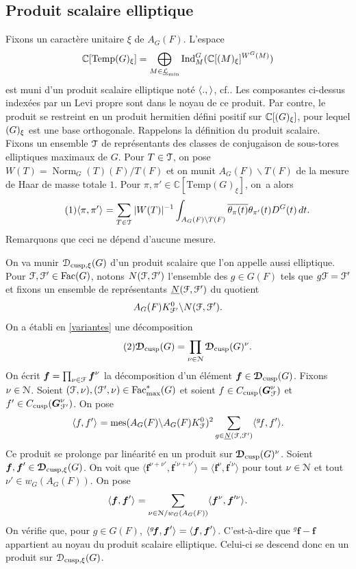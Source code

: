 \documentclass[11pt]{article}
\newcommand{\cf}{cf.\xspace}
\numberwithin{equation}{section}\providecommand{\og}{«\,}\providecommand{\fg}{\,»}
\let\mathcal \EuScript
\newcommand{\NoChangel}[1]{%
\expandafter\let\csname old\string#1\endcsname=#1
\let#1=\relax
\newcommand{#1}{\mathcode`l="716C\csname old\string#1\endcsname\mathcode`l="7160 }%
}
\let\<\langle
\let\>\rangle
\let\oldS\S
\renewcommand{\S}{\oldS\,}
\newcommand{\gf}{{}^g\!f}
\newcommand{\cusp}{\mathrm{cusp}}
\newcommand{\rell}{\mathrm{ell}} \NoChangel{\rell}
\newcommand{\Ell}{\mathrm{Ell}} \NoChangel{\Ell}
\newcommand{\Fac}{\mathrm{Fac}}
\newcommand{\Ind}{\mathrm{Ind}}
\newcommand{\Temp}{\mathrm{Temp}}
\DeclareMathOperator{\mes}{mes}
\DeclareMathOperator{\Norm}{Norm}
\newcommand{\bmf}{\boldsymbol{f}}
\newcommand{\gbmf}{{}^g\!\boldsymbol{f}}
\newcommand{\bG}{\boldsymbol{G}}
\newcommand{\cD}{\mathcal{D}}
\newcommand{\cF}{\mathcal{F}}
\newcommand{\cL}{\mathcal{L}}
\newcommand{\cN}{\mathcal{N}}
\newcommand{\cT}{\mathcal{T}}
\newcommand{\CC}{\mathbb{C}}
\theoremstyle{plain}
\theoremstyle{definition}
\begin{document}
\subsection{Produit scalaire elliptique}\label{produitscalaireelliptique}
Fixons un caractère unitaire $\xi$ de $A_{G}(F)$. L'espace
\[
\CC[\Temp(G)_{\xi}]=\bigoplus_{M\in\underline{\cL}_{\min}}\Ind_{M}^G(\CC[\Ell(M)_{\xi}]^{W^G(M)})
\]
est muni d'un produit scalaire elliptique noté $\<.,\>_{\rell}$, \cf \cite[\S6]{A2}. Les composantes ci-dessus indexées par un Levi propre sont dans le noyau de ce produit. Par contre, le produit se restreint en un produit hermitien défini positif sur $\CC[\Ell(G)_{\xi}]$, pour lequel $\Ell(G)_{\xi}$ est une base orthogonale. Rappelons la définition du produit scalaire. Fixons un ensemble $\cT_{\rell}$ de représentants des classes de conjugaison de sous-tores elliptiques maximaux de $G$. Pour $T\in \cT_{\rell}$, on pose $W(T)=\Norm_{G}(T)(F)/T(F)$ et on munit $A_{G}(F)\backslash T(F)$ de la mesure de Haar de masse totale $1$. Pour $\pi,\pi'\in \CC[\Temp(G)_{\xi}]$, on~a alors
\begin{equation}\tag{1}\label{produitscalaireelliptique1}
\<\pi,\pi'\>_{\rell}=\sum_{T\in \cT_{\rell}}\vert W(T)\vert ^{-1}\int_{A_{G}(F)\backslash T(F)}\overline{\theta_{\pi}(t)}\theta_{\pi'}(t)D^G(t)\,dt.
\end{equation}
Remarquons que ceci ne dépend d'aucune mesure.

On va munir $\cD_{\cusp,\xi}(G)$ d'un produit scalaire que l'on appelle aussi elliptique. Pour $\cF,\cF'\in \Fac(G)$,
notons $N(\cF,\cF')$ l'ensemble des $g\in G(F)$ tels que $g\cF=\cF'$ et fixons un ensemble de représentants $\underline{N}(\cF,\cF')$ du quotient
\[
A_{G}(F)K_{\cF'}^0\backslash N(\cF,\cF').
\]
On a établi en \ref{variantes} une décomposition
\begin{equation}\tag{2}\label{produitscalaireelliptique2}
\boldsymbol{\cD}_{\cusp}(G)=\prod_{\nu\in \cN}
\boldsymbol{\cD}_{\cusp}(G)^{\nu}.
\end{equation}
On écrit $\bmf=\prod_{\nu\in \cF}\bmf^{\nu}$ la décomposition d'un élément $\bmf\in \boldsymbol{\cD}_{\cusp}(G)$.
Fixons $\nu\in \cN$. Soient $(\cF,\nu),(\cF',\nu)\in \Fac^*_{\max}(G)$ et soient
$f\in C_{\cusp}(\bG_{\cF}^{\nu})$ et $f'\in C_{\cusp}(\bG_{\cF'}^{\nu})$. On pose
\[
\<f,f'\>_{\rell}= \mes(A_{G}(F)\backslash A_{G}(F)K_{\cF}^0)^2\sum_{g\in \underline{N}(\cF,\cF')}\<{\gf},f'\>.
\]
Ce produit se prolonge par linéarité en un produit sur $\boldsymbol{\cD}_{\cusp}(G)^{\nu}$.
Soient $\bmf, \bmf'\in \boldsymbol{\cD}_{\cusp,\xi}(G)$. On voit que $\<\bmf^{\nu+\nu'},\bmf^{\prime\nu+\nu'}\>=\<\bmf^{\nu},\bmf^{\prime\nu}\>$ pour tout $\nu\in \cN$ et tout $\nu'\in w_{G}(A_{G}(F))$. On pose
\[
\<\bmf,\bmf'\>_{\rell}=\sum_{\nu\in \cN/w_{G}(A_{G}(F))}\<\bmf^{\nu},\bmf^{\prime\nu}\>_{\rell}.
\]
On vérifie que, pour $g\in G(F)$, $\<{\gbmf},\bmf'\>_{\rell}=\<\bmf,\bmf'\>_{\rell}$. C'est-à-dire que $\gbmf-\bmf$ appartient au noyau du produit scalaire elliptique. Celui-ci se descend donc en un produit sur $\cD_{\cusp,\xi}(G)$.
\end{document}

